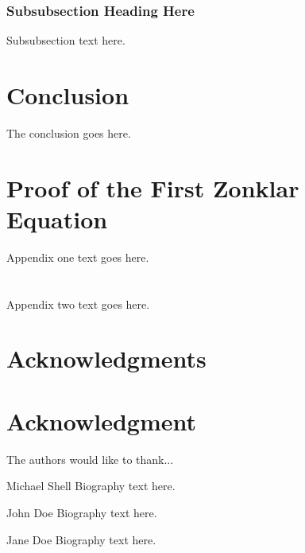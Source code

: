 \documentclass[10pt,journal,compsoc]{IEEEtran}
\begin{document}
\subsubsection{Subsubsection Heading Here}
Subsubsection text here.

\section{Conclusion}
The conclusion goes here.

\appendices
\section{Proof of the First Zonklar Equation}
Appendix one text goes here.

\section{}
Appendix two text goes here.

\ifCLASSOPTIONcompsoc
  \section*{Acknowledgments}
\else
  \section*{Acknowledgment}
\fi

The authors would like to thank...

\ifCLASSOPTIONcaptionsoff
  \newpage
\fi


\begin{IEEEbiography}{Michael Shell}
	Biography text here.
\end{IEEEbiography}

\begin{IEEEbiographynophoto}{John Doe}
	Biography text here.
\end{IEEEbiographynophoto}

\begin{IEEEbiographynophoto}{Jane Doe}
	Biography text here.
\end{IEEEbiographynophoto}
\end{document}
